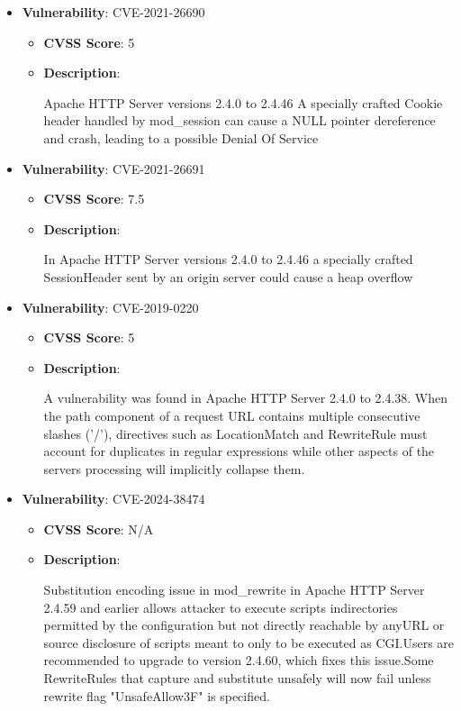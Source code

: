 \documentclass{article}
\begin{document}
\begin{itemize}
        \item \textbf{Vulnerability}: CVE-2021-26690
        \begin{itemize}
            \item \textbf{CVSS Score}:  5 
            \item \textbf{Description}:
            \parbox[t]{0.9\linewidth}{
                \ttfamily Apache HTTP Server versions 2.4.0 to 2.4.46 A specially crafted Cookie header handled by mod\_session can cause a NULL pointer dereference and crash, leading to a possible Denial Of Service
            }
        \end{itemize}
    
        \item \textbf{Vulnerability}: CVE-2021-26691
        \begin{itemize}
            \item \textbf{CVSS Score}:  7.5 
            \item \textbf{Description}:
            \parbox[t]{0.9\linewidth}{
                \ttfamily In Apache HTTP Server versions 2.4.0 to 2.4.46 a specially crafted SessionHeader sent by an origin server could cause a heap overflow
            }
        \end{itemize}
    
        \item \textbf{Vulnerability}: CVE-2019-0220
        \begin{itemize}
            \item \textbf{CVSS Score}:  5 
            \item \textbf{Description}:
            \parbox[t]{0.9\linewidth}{
                \ttfamily A vulnerability was found in Apache HTTP Server 2.4.0 to 2.4.38. When the path component of a request URL contains multiple consecutive slashes ('/'), directives such as LocationMatch and RewriteRule must account for duplicates in regular expressions while other aspects of the servers processing will implicitly collapse them.
            }
        \end{itemize}
    
        \item \textbf{Vulnerability}: CVE-2024-38474
        \begin{itemize}
            \item \textbf{CVSS Score}:  N/A 
            \item \textbf{Description}:
            \parbox[t]{0.9\linewidth}{
                \ttfamily Substitution encoding issue in mod\_rewrite in Apache HTTP Server 2.4.59 and earlier allows attacker to execute scripts indirectories permitted by the configuration but not directly reachable by anyURL or source disclosure of scripts meant to only to be executed as CGI.Users are recommended to upgrade to version 2.4.60, which fixes this issue.Some RewriteRules that capture and substitute unsafely will now fail unless rewrite flag "UnsafeAllow3F" is specified.
            }
        \end{itemize}
    

\end{itemize}
\end{document}
